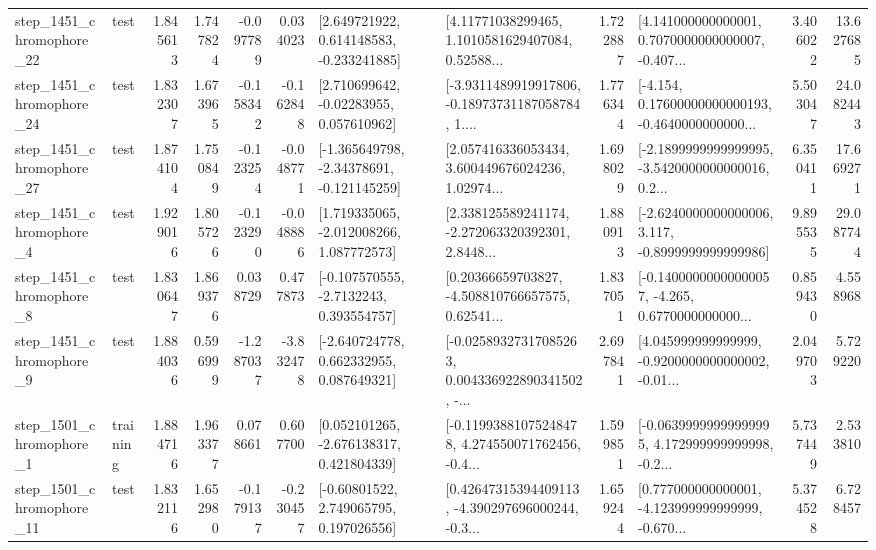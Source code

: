\begin{tabular}{llrrrrllrlrr}
 step\_1451\_chromophore\_22 &      test &      1.845613 &    1.747824 &     -0.097789 &  0.034023 &    [2.649721922, 0.614148583, -0.233241885] &  [4.11771038299465, 1.1010581629407084, 0.52588... &       1.722887 &  [4.141000000000001, 0.7070000000000007, -0.407... &            3.406022 &         13.627685 \\
 step\_1451\_chromophore\_24 &      test &      1.832307 &    1.673965 &     -0.158342 & -0.162848 &     [2.710699642, -0.02283955, 0.057610962] &  [-3.9311489919917806, -0.18973731187058784, 1.... &       1.776344 &  [-4.154, 0.17600000000000193, -0.4640000000000... &            5.503047 &         24.082443 \\
 step\_1451\_chromophore\_27 &      test &      1.874104 &    1.750849 &     -0.123254 & -0.048771 &   [-1.365649798, -2.34378691, -0.121145259] &  [2.057416336053434, 3.600449676024236, 1.02974... &       1.698029 &  [-2.1899999999999995, -3.5420000000000016, 0.2... &            6.350411 &         17.669271 \\
  step\_1451\_chromophore\_4 &      test &      1.929016 &    1.805726 &     -0.123290 & -0.048886 &    [1.719335065, -2.012008266, 1.087772573] &  [2.338125589241174, -2.272063320392301, 2.8448... &       1.880913 &  [-2.6240000000000006, 3.117, -0.8999999999999986] &            9.895535 &         29.087744 \\
  step\_1451\_chromophore\_8 &      test &      1.830647 &    1.869376 &      0.038729 &  0.477873 &     [-0.107570555, -2.7132243, 0.393554757] &  [0.20366659703827, -4.508810766657575, 0.62541... &       1.837051 &  [-0.14000000000000057, -4.265, 0.6770000000000... &            0.859430 &          4.558968 \\
  step\_1451\_chromophore\_9 &      test &      1.884036 &    0.596999 &     -1.287037 & -3.832478 &    [-2.640724778, 0.662332955, 0.087649321] &  [-0.02589327317085263, 0.004336922890341502, -... &       2.697841 &  [4.045999999999999, -0.9200000000000002, -0.01... &            2.049703 &          5.729220 \\
  step\_1501\_chromophore\_1 &  training &      1.884716 &    1.963377 &      0.078661 &  0.607700 &    [0.052101265, -2.676138317, 0.421804339] &  [-0.11993881075248478, 4.274550071762456, -0.4... &       1.599851 &  [-0.06399999999999995, 4.172999999999998, -0.2... &            5.737449 &          2.533810 \\
 step\_1501\_chromophore\_11 &      test &      1.832116 &    1.652980 &     -0.179137 & -0.230457 &     [-0.60801522, 2.749065795, 0.197026556] &  [0.42647315394409113, -4.390297696000244, -0.3... &       1.659244 &  [0.777000000000001, -4.123999999999999, -0.670... &            5.374528 &          6.728457 \\

\end{tabular}
